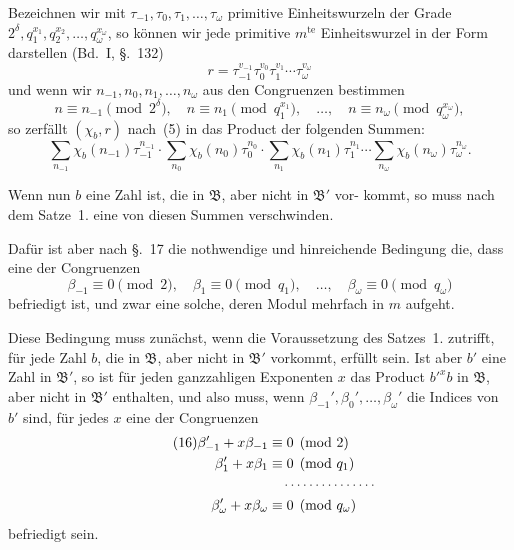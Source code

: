 \documentclass[12pt,a4paper]{article}
\theoremstyle{plain}
\theoremstyle{definition}
\theoremstyle{remark}
\begin{document}
Bezeichnen wir mit $\tau_{-1}, \tau_0, \tau_1, \ldots, \tau_\omega$ primitive Einheitswurzeln
der Grade $2^\delta, q_1^{x_1}, q_2^{x_2}, \ldots, q_\omega^{x_\omega}$, so können wir jede primitive $m^{\text{te}}$
Einheitswurzel in der Form darstellen (Bd.~I, \S.~132)
\begin{equation}\tag{12}
r = \tau_{-1}^{v_{-1}} \tau_0^{v_0} \tau_1^{v_1} \cdots \tau_\omega^{v_\omega}
\end{equation}
und wenn wir $n_{-1}, n_0, n_1, \ldots, n_\omega$ aus den Congruenzen bestimmen
\begin{equation}\tag{13}
n \equiv n_{-1} \pmod{2^\delta}, \quad n \equiv n_1 \pmod{q_1^{x_1}}, \quad \ldots, \quad n \equiv n_\omega \pmod{q_\omega^{x_\omega}},
\end{equation}
so zerfällt $(\chi_b, r)$ nach~(5) in das Product der folgenden Summen:
\begin{equation}\tag{14}
\sum_{n_{-1}} \chi_b(n_{-1}) \tau_{-1}^{n_{-1}} \cdot \sum_{n_0} \chi_b(n_0) \tau_0^{n_0} \cdot \sum_{n_1} \chi_b(n_1) \tau_1^{n_1} \cdots \sum_{n_\omega} \chi_b(n_\omega) \tau_\omega^{n_\omega}.
\end{equation}

Wenn nun $b$ eine Zahl ist, die in $\mathfrak{B}$, aber nicht in $\mathfrak{B}'$ vor-
kommt, so muss nach dem Satze~1. eine von diesen Summen
verschwinden.

Dafür ist aber nach \S.~17 die nothwendige und hinreichende
Bedingung die, dass eine der Congruenzen
\begin{equation}\tag{15}
\beta_{-1} \equiv 0 \pmod{2}, \quad \beta_1 \equiv 0 \pmod{q_1}, \quad \ldots, \quad \beta_\omega \equiv 0 \pmod{q_\omega}
\end{equation}
befriedigt ist, und zwar eine solche, deren Modul mehrfach in $m$
aufgeht.

Diese Bedingung muss zunächst, wenn die Voraussetzung
des Satzes~1. zutrifft, für jede Zahl $b$, die in $\mathfrak{B}$, aber nicht in $\mathfrak{B}'$
vorkommt, erfüllt sein. Ist aber $b'$ eine Zahl in $\mathfrak{B}'$, so ist für
jeden ganzzahligen Exponenten $x$ das Product $b'^x b$ in $\mathfrak{B}$, aber
nicht in $\mathfrak{B}'$ enthalten, und also muss, wenn $\beta_{-1}', \beta_0', \ldots, \beta_\omega'$
die Indices von $b'$ sind, für jedes $x$ eine der Congruenzen
\begin{align}\tag{16}
\beta_{-1}' + x\beta_{-1} &\equiv 0 \pmod{2} \notag\\
\beta_1' + x\beta_1 &\equiv 0 \pmod{q_1} \notag\\
&\quad \cdots \cdots \cdots \cdots \cdots \notag\\
\beta_\omega' + x\beta_\omega &\equiv 0 \pmod{q_\omega} \notag
\end{align}
befriedigt sein.
\end{document}
